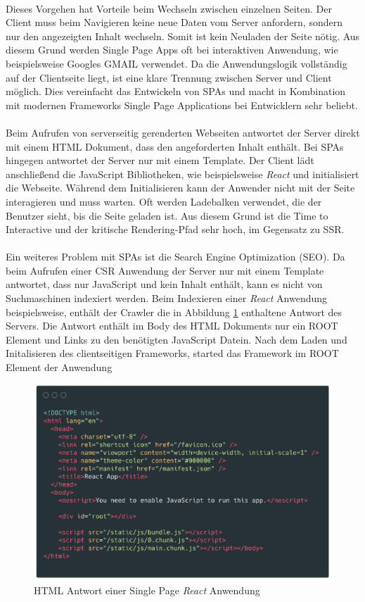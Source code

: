 \documentclass[runningheads]{llncs}
\begin{document}
\\
Dieses Vorgehen hat Vorteile beim Wechseln zwischen einzelnen Seiten. 
Der Client muss beim Navigieren keine neue Daten vom Server anfordern, 
sondern nur den angezeigten Inhalt wechseln. 
Somit ist kein Neuladen der Seite nötig. 
Aus diesem Grund werden Single Page Apps oft bei interaktiven Anwendung, 
wie beispielsweise Googles GMAIL verwendet. 
Da die Anwendungslogik vollständig auf der Clientseite liegt, 
ist eine klare Trennung zwischen Server und Client möglich. 
Dies vereinfacht das Entwickeln von SPAs und
macht in Kombination mit modernen Frameworks 
Single Page Applications bei Entwicklern sehr beliebt.
\\
\\
Beim Aufrufen von serverseitig gerenderten Webseiten antwortet
der Server direkt mit einem HTML Dokument, 
dass den angeforderten Inhalt enthält. 
Bei SPAs hingegen antwortet der Server nur mit einem Template. 
Der Client lädt anschließend die JavaScript Bibliotheken, 
wie beispielsweise \textit{React} und initialisiert die Webseite. 
Während dem Initialisieren kann der Anwender nicht mit der Seite interagieren
und muss warten. Oft werden Ladebalken verwendet, 
die der Benutzer sieht, bis die Seite geladen ist. 
Aus diesem Grund ist die Time to Interactive und 
der kritische Rendering-Pfad sehr hoch, im Gegensatz zu SSR. 
\\
\\
Ein weiteres Problem mit SPAs ist die Search Engine Optimization (SEO). 
Da beim Aufrufen einer CSR Anwendung der Server nur mit einem Template 
antwortet, dass nur JavaScript und kein Inhalt enthält, 
kann es nicht von Suchmaschinen indexiert werden. 
Beim Indexieren einer \textit{React} Anwendung beispielsweise, 
enthält der Crawler die in Abbildung \ref{HTML Antwort einer Single Page React Anwendung} enthaltene Antwort des Servers. 
Die Antwort enthält im Body des HTML Dokuments nur ein ROOT Element und Links zu
den benötigten JavaScript Datein. Nach dem Laden und Initalisieren des clientseitigen Frameworks,
started das Framework im ROOT Element der Anwendung
\begin{figure}[h]
  \centering
  \includegraphics[width=12cm]{images/react-code-small}
  \caption{HTML Antwort einer Single Page \textit{React} Anwendung}
  \label{HTML Antwort einer Single Page React Anwendung}
\end{figure}
\end{document}
